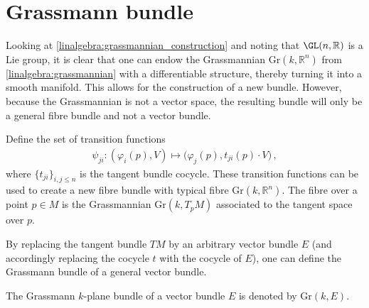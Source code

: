 \section{Grassmann bundle}

    Looking at \cref{linalgebra:grassmannian_construction} and noting that $\GL(n,\mathbb{R})$ is a Lie group, it is clear that one can endow the Grassmannian $\mathrm{Gr}(k,\mathbb{R}^n)$ from \cref{linalgebra:grassmannian} with a differentiable structure, thereby turning it into a smooth manifold. This allows for the construction of a new bundle. However, because the Grassmannian is not a vector space, the resulting bundle will only be a general fibre bundle and not a vector bundle.

    \begin{construct}\label{bundle:grassmann_bundle}
        Define the set of transition functions
        \begin{gather}
            \psi_{ji}:(\varphi_i(p),V)\mapsto\bigl(\varphi_j(p),t_{ji}(p)\cdot V\bigr)\,,
        \end{gather}
        where $\{t_{ji}\}_{i,j\leq n}$ is the tangent bundle cocycle. These transition functions can be used to create a new fibre bundle with typical fibre $\mathrm{Gr}(k,\mathbb{R}^n)$. The fibre over a point $p\in M$ is the Grassmannian $\mathrm{Gr}(k,T_pM)$ associated to the tangent space over $p$.

        By replacing the tangent bundle $TM$ by an arbitrary vector bundle $E$ (and accordingly replacing the cocycle $t$ with the cocycle of $E$), one can define the Grassmann bundle of a general vector bundle.
    \end{construct}
    \begin{notation}
        The Grassmann $k$-plane bundle of a vector bundle $E$ is denoted by $\mathrm{Gr}(k,E)$.
    \end{notation}


